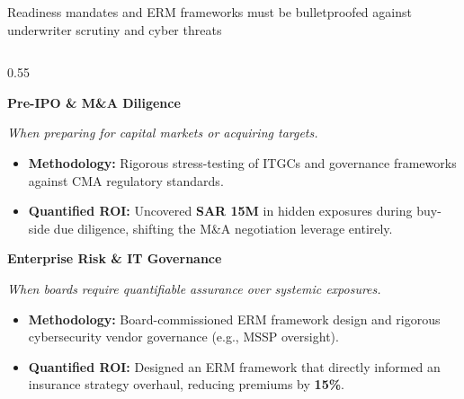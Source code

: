 \documentclass[aspectratio=169, 9pt]{beamer}
\begin{document}
\begin{frame}{Readiness mandates and ERM frameworks must be bulletproofed against underwriter scrutiny and cyber threats}
    \begin{columns}[T]
        \begin{column}{0.55\textwidth}
            \begin{tcolorbox}[colback=bcgLightGray, colframe=bcgLightGray, arc=0pt, left=5pt, top=3pt, bottom=3pt]
                \textbf{\normalsize \color{bcgGreen} Pre-IPO \& M\&A Diligence}
            \end{tcolorbox}
            \textit{\small \color{gray} When preparing for capital markets or acquiring targets.}
            \vspace{0.1cm}
            \begin{itemize}
                \item \textbf{Methodology:} Rigorous stress-testing of ITGCs and governance frameworks against CMA regulatory standards.
                \item \textbf{\color{bcgGreen} Quantified ROI:} Uncovered \textbf{SAR 15M} in hidden exposures during buy-side due diligence, shifting the M\&A negotiation leverage entirely.
            \end{itemize}
            
            \vspace{0.2cm}
            \begin{tcolorbox}[colback=bcgLightGray, colframe=bcgLightGray, arc=0pt, left=5pt, top=3pt, bottom=3pt]
                \textbf{\normalsize \color{bcgGreen} Enterprise Risk \& IT Governance}
            \end{tcolorbox}
            \textit{\small \color{gray} When boards require quantifiable assurance over systemic exposures.}
            \vspace{0.1cm}
            \begin{itemize}
                \item \textbf{Methodology:} Board-commissioned ERM framework design and rigorous cybersecurity vendor governance (e.g., MSSP oversight).
                \item \textbf{\color{bcgGreen} Quantified ROI:} Designed an ERM framework that directly informed an insurance strategy overhaul, reducing premiums by \textbf{15\%}.
            \end{itemize}
        \end{column}
        

\end{columns}
\end{frame}
\end{document}
